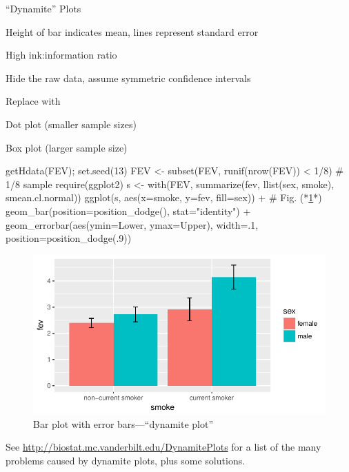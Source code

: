 \bi
\item ``Dynamite'' Plots
\item Height of bar indicates mean, lines represent standard error
\item High ink:information ratio
\item Hide the raw data, assume symmetric confidence intervals
\item Replace with
  \bi
   \item Dot plot (smaller sample sizes)
   \item Box plot (larger sample size)
  \ei
\ei
\begin{Schunk}
\begin{Sinput}
getHdata(FEV); set.seed(13)   
FEV <- subset(FEV, runif(nrow(FEV)) < 1/8)   # 1/8 sample
require(ggplot2)
s <- with(FEV, summarize(fev, llist(sex, smoke), smean.cl.normal))
ggplot(s, aes(x=smoke, y=fev, fill=sex)) +    # Fig. (*\ref{fig:descript-dynamite}*)
    geom_bar(position=position_dodge(), stat="identity") +
    geom_errorbar(aes(ymin=Lower, ymax=Upper),
                  width=.1,
                  position=position_dodge(.9))
\end{Sinput}
\begin{figure}[htbp]

\centerline{\includegraphics{descript-dynamite-1} }

\caption[Bar plot with error bars---``dynamite plot'']{Bar plot with error bars---``dynamite plot''}\label{fig:descript-dynamite}
\end{figure}
\end{Schunk}
See \url{http://biostat.mc.vanderbilt.edu/DynamitePlots} for a list of
the many problems caused by dynamite plots, plus some solutions.

